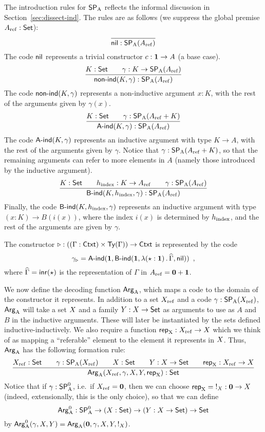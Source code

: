 \documentclass{article}
\begin{document}
The introduction rules for $\mathsf{SP}_{\mathrm{A}}$ reflects the informal discussion in
Section~\ref{sec:dissect-ind}. The rules are as follows (we suppress
the global premise $A_{\mathrm{ref}} : \mathsf{Set}$):
\[
\infer{\nilA : \SPA(\Aref)}{}
\]
%
The code $\mathsf{nil}$ represents a trivial constructor $c : \mathbf{1} \to A$ (a base case).
%
\[
\infer{\nonindA(K, \gamma) : \SPA(\Aref)}{K : \Set & \quad \gamma : K \to \SPA(\Aref)}
\]
%
The code $\mathsf{non}\text{-}\mathsf{ind}(K, \gamma)$ represents a non-inductive argument $x
: K$, with the rest of the arguments given by $\gamma(x)$.
%
\[
\infer{\AindA(K, \gamma) : \SPA(\Aref)}{K : \Set & \quad \gamma : \SPA(\Aref + K)}
\]
%
The code $\mathsf{A}\text{-}\mathsf{ind}(K, \gamma)$ represents an inductive argument with
type $K \to A$, with the rest of the arguments given by
$\gamma$. Notice that $\gamma : \mathsf{SP}_{\mathrm{A}}(A_{\mathrm{ref}} + K)$, so that the
remaining arguments can refer to more elements in $A$ (namely those
introduced by the inductive argument).
%
\[
\infer{\BindA(K, \hindex, \gamma) : \SPA(\Aref)}{K : \Set & \quad \hindex : K \to \Aref & \quad \gamma : \SPA(\Aref)}
\]
%
Finally, the code $\mathsf{B}\text{-}\mathsf{ind}(K, h_{\mathrm{index}}, \gamma)$ represents an inductive
argument with type $(x : K) \to B(i(x))$, where the index $i(x)$ is
determined by $h_{\mathrm{index}}$, and the rest of the arguments are given by
$\gamma$.
%

\begin{example}
  The constructor $\triangleright : ((\Gamma : \mathsf{Ctxt}) \times \mathsf{Ty}(\Gamma))
  \to \mathsf{Ctxt}$ is represented by the code
\[
\gamma_{\triangleright} = \mathsf{A}\text{-}\mathsf{ind}(\mathbf{1}, \mathsf{B}\text{-}\mathsf{ind}(\mathbf{1}, \lambda (\star : \mathbf{1})\,.\,\widehat{\Gamma}, \mathsf{nil})) \enspace ,
\]
where $\widehat{\Gamma} = \mathsf{inr}(\star)$ is the representation of $\Gamma$ in $A_{\mathrm{ref}} = \mathbf{0} + \mathbf{1}$.
\blackqed
\end{example}

We now define the decoding function $\mathsf{Arg}_{\mathrm{A}}$, which maps a code to the
domain of the constructor it represents. In addition to a set $X_{\mathrm{ref}}$
and a code $\gamma : \mathsf{SP}_{\mathrm{A}}(X_{\mathrm{ref}})$, $\mathsf{Arg}_{\mathrm{A}}$ will take a set $X$ and a
family $Y : X \to \mathsf{Set}$ as arguments to use as $A$ and $B$ in the
inductive arguments. These will later be instantiated by the sets
defined inductive-inductively. We also require a function $\mathsf{rep}_{\mathrm{X}} :
X_{\mathrm{ref}} \to X$ which we think of as mapping a ``referable'' element to
the element it represents in $X$. Thus, $\mathsf{Arg}_{\mathrm{A}}$ has the
following formation rule:
%
\[
\infer{\ArgA(\Xref, \gamma, \A, \B, \repA) : \Set}{\Xref : \Set
                                         & \quad \gamma : \SPA(\Xref)
                                         & \quad \A : \Set
                                         & \quad \B : \A \to \Set
                                         & \quad \repA : \Xref \to \A}
\]
%
Notice that if $\gamma : \mathsf{SP}^{0}_{\mathrm{A}}$, i.e.\ if $X_{\mathrm{ref}} = \mathbf{0}$, then we can
choose $\mathsf{rep}_{\mathrm{X}} = {} !_{X} : \mathbf{0} \to X$ (indeed, extensionally,
this is the only choice), so that we can define
\[
\mathsf{Arg}^{0}_{\mathrm{A}} : \mathsf{SP}^{0}_{\mathrm{A}} \to (X : \mathsf{Set}) \to (Y : X \to \mathsf{Set}) \to \mathsf{Set}
\]
by $\mathsf{Arg}^{0}_{\mathrm{A}}(\gamma, X, Y) = \mathsf{Arg}_{\mathrm{A}}(\mathbf{0}, \gamma, X, Y, !_{X})$.
\end{document}

